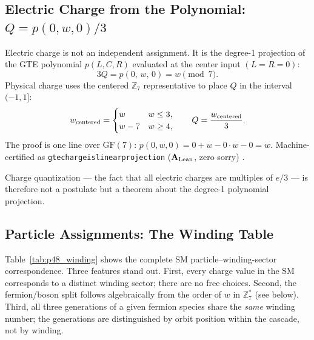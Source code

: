 \documentclass[11pt,openany]{book}
\theoremstyle{remark}
\newcommand{\ZS}{\mathbb{Z}_7}
\newcommand{\lean}[1]{%
  \penalty-100
  \begingroup\def\_{\textunderscore\allowbreak}\texttt{#1}\endgroup}
\newcommand{\CatAL}{\ensuremath{\textbf{A}_{\rm Lean}}}
\begin{document}
\subsection*{Electric Charge from the Polynomial: $Q = p(0,w,0)/3$}

Electric charge is not an independent assignment.  It is the degree-1 projection of
the GTE polynomial $p(L,C,R)$ evaluated at the center input $(L=R=0)$:
\begin{equation}
  3Q = p(0,\, w,\, 0) = w \pmod{7}.
  \label{eq:charge_formula}
\end{equation}
Physical charge uses the centered $\ZS$ representative to place $Q$ in the interval
$(-1,1]$:
\begin{equation}
  w_{\rm centered} = \begin{cases} w & w \leq 3,\\ w - 7 & w \geq 4,\end{cases}
  \qquad Q = \frac{w_{\rm centered}}{3}.
  \label{eq:centered}
\end{equation}
The proof is one line over $\mathrm{GF}(7)$: $p(0,w,0)=0+w-0\cdot w-0=w$.
Machine-certified as \lean{gte\_charge\_is\_linear\_projection} (\CatAL, zero sorry)
\cite{SpivackThreeTapeCMCA,SpivackGTEPolynomialUFT}.

Charge quantization --- the fact that all electric charges are multiples of $e/3$ ---
is therefore not a postulate but a theorem about the degree-1 polynomial projection.

\subsection*{Particle Assignments: The Winding Table}

Table~\ref{tab:p48_winding} shows the complete SM particle--winding-sector correspondence.
Three features stand out.  First, every charge value in the SM corresponds to a distinct
winding sector; there are no free choices.  Second, the fermion/boson split follows
algebraically from the order of $w$ in $\ZS^*$ (see below).  Third, all three
generations of a given fermion species share the \emph{same} winding number;
the generations are distinguished by orbit position within the cascade, not by winding.
\end{document}
